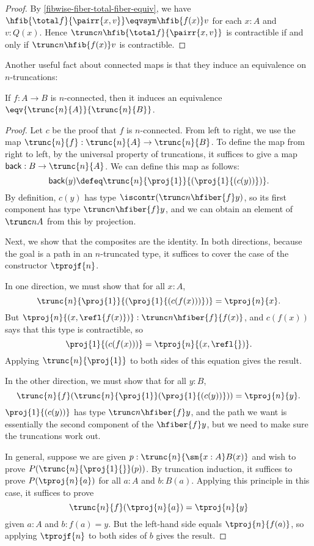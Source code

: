 \begin{proof}
By \cref{fibwise-fiber-total-fiber-equiv}, we have
$\hfib{\total f}{\pairr{x,v}}\eqvsym\hfib{f(x)}v$
for each $x:A$ and $v:Q(x)$. Hence $\trunc n{\hfib{\total f}{\pairr{x,v}}}$ is contractible if and only if
$\trunc n{\hfib{f(x)}v}$ is contractible.
\end{proof}

Another useful fact about connected maps is that they induce an
equivalence on $n$-truncations:

\begin{lem} \label{lem:connected-map-equiv-truncation}
If $f : A \to B$ is $n$-connected, then it induces an equivalence
$\eqv{\trunc{n}{A}}{\trunc{n}{B}}$.
\end{lem}
\begin{proof}
Let $c$ be the proof that $f$ is $n$-connected.  From left to right, we
use the map $\trunc{n}{f} : \trunc{n}{A} \to \trunc{n}{B}$.
To define the map from right to left, by the universal property of
truncations, it suffices to give a map $\mathsf{back} : B \to {\trunc{n}{A}}$.  We can
define this map as follows:
\[
\mathsf{back}(y) \defeq \trunc{n}{\proj{1}}{(\proj{1}{(c(y))})}.
\]
By definition, $c(y)$ has type $\iscontr(\trunc n {\hfiber{f}y})$, so its
first component has type $\trunc n{\hfiber{f}y}$, and we can obtain an
element of $\trunc n A$ from this by projection.

Next, we show that the composites are the identity.  In both directions,
because the goal is a path in an $n$-truncated type, it suffices to
cover the case of the constructor $\tprojf{n}$.

In one direction, we must show that for all $x:A$,
\[
\trunc{n}{\proj{1}}{(\proj{1}{(c(f(x)))})} = \tproj{n}{x}.
\]
But $\tproj{n}{(x, \refl{f(x)})} : \trunc n{\hfiber{f}{f(x)}}$, and
$c(f(x))$ says that this type is contractible, so
\[
\proj{1}{(c(f(x)))} = \tproj{n}{(x, \refl{})}.
\]
Applying $\trunc{n}{\proj{1}}$ to both sides of this equation gives the
result.

In the other direction, we must show that for all $y:B$,
\[
\trunc{n}{f}(\trunc{n}{\proj{1}} (\proj{1}{(c(y))})) = \tproj{n}{y}.
\]
$\proj{1}{(c(y))}$ has type $\trunc n {\hfiber{f}y}$, and the path we
want is essentially the second component of the $\hfiber{f}y$, but we
need to make sure the truncations work out.

In general, suppose we are given $p:\trunc{n}{\sm{x:A} B(x)}$ and wish to prove
$P(\trunc{n}{\proj{1}{}}(p))$. By truncation induction, it suffices to
prove $P(\tproj{n}{a})$ for all $a:A$ and $b:B(a)$.  Applying this
principle in this case, it suffices to prove
\[
\trunc{n}{f}(\tproj{n}{a}) = \tproj{n}{y}
\]
given $a:A$ and $b:f (a) = y$.  But the left-hand side equals $\tproj{n}{f (a)}$,
so applying $\tprojf{n}$ to both sides of $b$ gives the result.
\end{proof}

